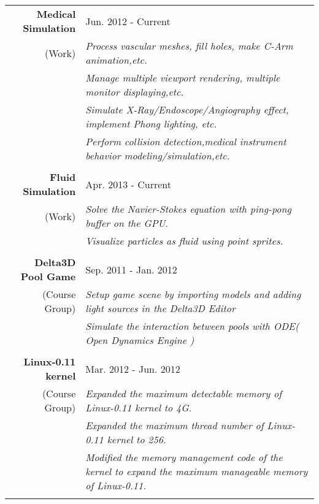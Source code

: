 \documentclass[a4paper,10pt]{article} %
\begin{document}
\begin{tabular}{rp{12.0cm}}
\textbf{Medical Simulation} &  Jun. 2012 - Current\\
\footnotesize{(Work)}& \footnotesize{\emph{Process vascular meshes, fill holes, make C-Arm animation,etc.}}\\
 & \footnotesize{ \emph{Manage multiple viewport rendering, multiple monitor displaying,etc. }}\\
 & \footnotesize{ \emph{Simulate X-Ray/Endoscope/Angiography effect, implement Phong lighting, etc.}}\\
 & \footnotesize{\emph{Perform collision detection,medical instrument behavior modeling/simulation,etc.}}\\

\multicolumn{2}{c}{} \\


\textbf{Fluid Simulation} &  Apr. 2013 - Current \\
\footnotesize{(Work)}& \footnotesize{\emph{Solve the Navier-Stokes equation with ping-pong buffer on the GPU}}.\\
& \footnotesize{\emph{Visualize particles as fluid using point sprites.}}\\
\multicolumn{2}{c}{} \\


\textbf{Delta3D Pool Game} & Sep. 2011 - Jan. 2012 \\
\footnotesize{(Course Group)} & \footnotesize{\emph{Setup game scene by importing models and adding light sources in the Delta3D Editor}}\\
& \footnotesize{\emph{ Simulate the interaction between pools with ODE( Open Dynamics Engine )}}\\
\multicolumn{2}{c}{} \\


\textbf{Linux-0.11 kernel} & Mar. 2012 - Jun. 2012 \\
\footnotesize{(Course Group)} & \footnotesize{\emph{Expanded the maximum detectable memory of Linux-0.11 kernel to 4G.}}\\
& \footnotesize{\emph{Expanded the maximum thread number of Linux-0.11 kernel to 256. }}\\
& \footnotesize{\emph{Modified the memory management code of the kernel to expand the maximum manageable memory of Linux-0.11. }}\\
\multicolumn{2}{c}{} \\


\end{tabular}
\end{document}

